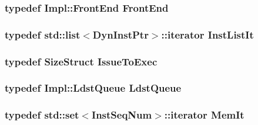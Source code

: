 \label{classLWBackEnd_a91ea582041466725b4b17ce19f98685f}
\hypertarget{classLWBackEnd_abe8e1d8243582d5024a1076f6091d9fe}{
\subsubsection[{FrontEnd}]{\setlength{\rightskip}{0pt plus 5cm}typedef Impl::FrontEnd {\bf FrontEnd}}}
\label{classLWBackEnd_abe8e1d8243582d5024a1076f6091d9fe}
\hypertarget{classLWBackEnd_a4da46d72d68fcd5bfe65dc701c358379}{
\subsubsection[{InstListIt}]{\setlength{\rightskip}{0pt plus 5cm}typedef {\bf std::list}$<${\bf DynInstPtr}$>$::iterator {\bf InstListIt}}}
\label{classLWBackEnd_a4da46d72d68fcd5bfe65dc701c358379}
\hypertarget{classLWBackEnd_a5badfe54e71b8fccb3d371013a8eef73}{
\subsubsection[{IssueToExec}]{\setlength{\rightskip}{0pt plus 5cm}typedef {\bf SizeStruct} {\bf IssueToExec}}}
\label{classLWBackEnd_a5badfe54e71b8fccb3d371013a8eef73}
\hypertarget{classLWBackEnd_a4c90230ea80fdcedea6e4fb9b43009cd}{
\subsubsection[{LdstQueue}]{\setlength{\rightskip}{0pt plus 5cm}typedef Impl::LdstQueue {\bf LdstQueue}}}
\label{classLWBackEnd_a4c90230ea80fdcedea6e4fb9b43009cd}
\hypertarget{classLWBackEnd_a3beb474846c53de6d7b8047314dcf3cd}{
\subsubsection[{MemIt}]{\setlength{\rightskip}{0pt plus 5cm}typedef std::set$<${\bf InstSeqNum}$>$::iterator {\bf MemIt}}}
